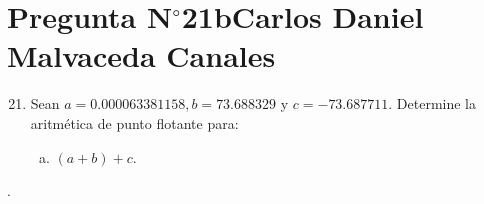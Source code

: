 \section{Pregunta N$^{\circ}$21b\qquad Carlos Daniel Malvaceda Canales}

\begin{frame}
	\begin{enumerate}\setcounter{enumi}{20}
		\item

		      Sean $a=0.000063381158, b=73.688329$ y $c=-73.687711$.
		      Determine la aritmética de punto flotante para:

		      \begin{enumerate}[b)]
			      \item

			            $\left(a+b\right)+c$.
		      \end{enumerate}
	\end{enumerate}

	\begin{solution}
		.
	\end{solution}
\end{frame}